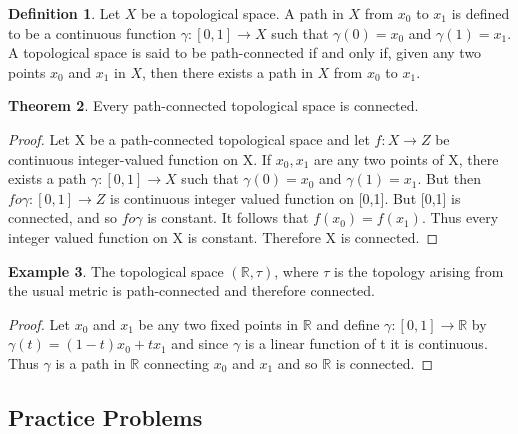 \documentclass[11pt,a4paper]{article}
\theoremstyle{definition}
\newtheorem{thm}{Theorem}[subsection]
\newtheorem{defn}[thm]{Definition}
\newtheorem{exa}[thm]{Example}
\begin{document}
\begin{defn}
Let $X$ be a topological space. A path in $X$ from $x_0$ to $x_1$ is defined to be a continuous function $\gamma:[0,1]\rightarrow X$ such that $\gamma(0)=x_0$ and $\gamma(1)=x_1$.\\ 
A topological space is said to be path-connected if and only if, given any two points $x_0$ and $x_1$ in $X$, then there exists a path in $X$ from $x_0$ to $x_1$.
\end{defn}






\begin{thm}
Every path-connected topological space is connected.
\end{thm}

\begin{proof}
Let X be a path-connected topological space and let $f:X\rightarrow Z$ be continuous integer-valued function on X. If $x_0,x_1$ are any two points of X, there exists a path $\gamma:[0,1]\rightarrow X$ such that $\gamma(0)=x_0$ and $\gamma(1)=x_1$. But then $fo\gamma:[0,1]\rightarrow Z$ is continuous integer valued function on [0,1]. But [0,1] is connected, and so $fo\gamma$ is constant. It follows that $f(x_0)=f(x_1)$. Thus every integer valued function on X is constant. Therefore X is connected.
\end{proof}

\begin{exa}
The topological space $(\mathbb{R},\tau)$, where $\tau$ is the topology arising from the usual metric is path-connected and therefore connected.
\end{exa}

\begin{proof}
Let $x_0$ and $x_1$ be any two fixed points in $\mathbb{R}$ and define $\gamma:[0,1]\rightarrow \mathbb{R}$ by $\gamma(t)=(1-t)x_0+tx_1$ and since $\gamma$ is a linear function of t it is continuous. Thus $\gamma$ is a path in $\mathbb{R}$ connecting $x_0$ and $x_1$ and so $\mathbb{R}$ is connected.
\end{proof}







\subsection{Practice Problems}
\end{document}

